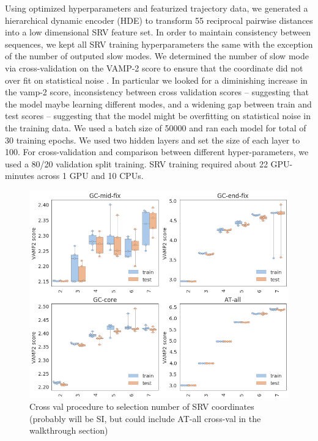 \documentclass[journal=jpcbfk,manuscript=article]{achemso}
\begin{document}
Using optimized hyperparameters and featurized trajectory data, we generated a hierarchical dynamic encoder (HDE) to transform 55 reciprocal pairwise distances into a low dimensional SRV feature set. In order to maintain consistency between sequences, we kept all SRV training hyperparameters the same with the exception of the number of outputed slow modes. We determined the number of slow mode via cross-validation on the VAMP-2 score to ensure that the coordinate did not over fit on statistical noise \citep{McGibbon2015VariationalKinetics}. In particular we looked for a diminishing increase in the vamp-2 score, inconsistency between cross validation scores -- suggesting that the model maybe learning different modes, and a widening gap between train and test scores -- suggesting that the model might be overfitting on statistical noise in the training data. We used a batch size of 50000 and ran each model for total of 30 training epochs. We used two hidden layers and set the size of each layer to 100. For cross-validation and comparison between different hyper-parameters, we used a 80/20 validation split training. SRV training required about 22 GPU-minutes across 1 GPU and 10 CPUs.

\begin{figure}[ht!]
	\begin{center}
        \includegraphics[width=\textwidth]{Figs/figs_0804/srv_crossval.png}
        \caption{Cross val procedure to selection number of SRV coordinates (probably will be SI, but could include AT-all cross-val in the walkthrough section)}
        \label{fig:srv_crossval}
	\end{center}
\end{figure}
\end{document}
